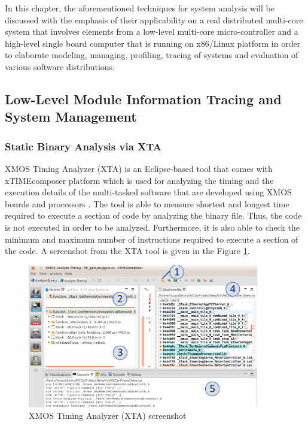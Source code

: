 In this chapter, the aforementioned techniques for system analysis will be discussed with the emphasis of their applicability on a real distributed multi-core system that involves elements from a low-level multi-core micro-controller and a high-level single board computer that is running on x86/Linux platform in order to elaborate  modeling, managing, profiling, tracing of systems and evaluation of various software distributions.

\subsection{Low-Level Module Information Tracing and System Management}
\subsubsection{Static Binary Analysis via XTA} \label{staticbinary}
XMOS Timing Analyzer (XTA) \cite{xtamanual} is an Eclipse-based tool that comes with xTIMEcomposer platform which is used for analyzing the timing and the execution details of the multi-tasked software that are developed using XMOS boards and processors \cite{xtamanual}. The tool is able to measure shortest and longest time required to execute a section of code by analyzing the binary file. Thus, the code is not executed in order to be analyzed. Furthermore, it is also able to check the minimum and maximum number of instructions required to execute a section of the code.  A screenshot from the XTA tool is given in the Figure \ref{fig:xtass}.

\begin{figure}[!ht]
	\centering
	\includegraphics[width=0.9\textwidth]{content/images/xtass.png}
	\caption{XMOS Timing Analyzer (XTA) screenshot}
	\label{fig:xtass}
\end{figure}

